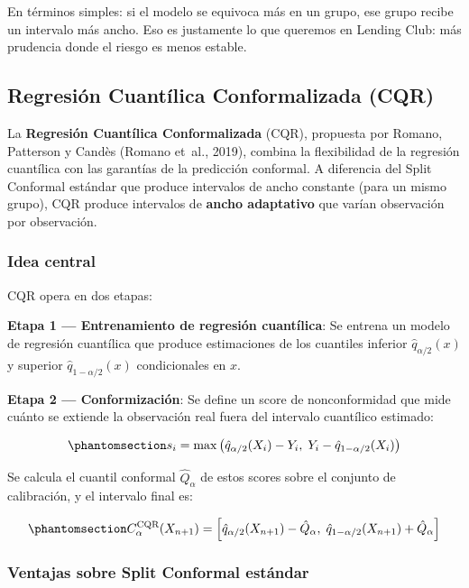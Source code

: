 \documentclass[
  spanish,
  11pt,
  letterpaper,
]{scrbook}
\theoremstyle{plain}
\theoremstyle{remark}
\begin{document}
En términos simples: si el modelo se equivoca más en un grupo, ese grupo
recibe un intervalo más ancho. Eso es justamente lo que queremos en
Lending Club: más prudencia donde el riesgo es menos estable.

\subsection{Regresión Cuantílica Conformalizada (CQR)}\label{sec-cqr}

La \textbf{Regresión Cuantílica Conformalizada} (CQR), propuesta por
Romano, Patterson y Candès (Romano et~al., 2019), combina la
flexibilidad de la regresión cuantílica con las garantías de la
predicción conformal. A diferencia del Split Conformal estándar que
produce intervalos de ancho constante (para un mismo grupo), CQR produce
intervalos de \textbf{ancho adaptativo} que varían observación por
observación.

\subsubsection{Idea central}\label{sec-cqr-idea}

CQR opera en dos etapas:

\textbf{Etapa 1 --- Entrenamiento de regresión cuantílica}: Se entrena
un modelo de regresión cuantílica que produce estimaciones de los
cuantiles inferior \(\hat{q}_{\alpha/2}(x)\) y superior
\(\hat{q}_{1-\alpha/2}(x)\) condicionales en \(x\).

\textbf{Etapa 2 --- Conformización}: Se define un score de
nonconformidad que mide cuánto se extiende la observación real fuera del
intervalo cuantílico estimado:

\begin{equation}\protect\phantomsection\label{eq-cqr-score}{
s_i = \max\left(\hat{q}_{\alpha/2}(X_i) - Y_i, \; Y_i - \hat{q}_{1-\alpha/2}(X_i)\right)
}\end{equation}

Se calcula el cuantil conformal \(\hat{Q}_\alpha\) de estos scores sobre
el conjunto de calibración, y el intervalo final es:

\begin{equation}\protect\phantomsection\label{eq-cqr-interval}{
C_\alpha^{\text{CQR}}(X_{n+1}) = \left[\hat{q}_{\alpha/2}(X_{n+1}) - \hat{Q}_\alpha, \; \hat{q}_{1-\alpha/2}(X_{n+1}) + \hat{Q}_\alpha\right]
}\end{equation}

\subsubsection{Ventajas sobre Split Conformal
estándar}\label{sec-cqr-advantages}
\end{document}
